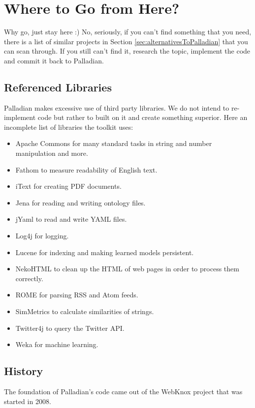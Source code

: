 \documentclass[a4paper,twoside]{book}      %
\begin{document}
\chapter{Where to Go from Here?}
Why go, just stay here :) No, seriously, if you can't find something that you need, there is a list of similar projects in Section \ref{sec:alternativesToPalladian} that you can scan through. If you still can't find it, research the topic, implement the code and commit it back to Palladian.

\section{Referenced Libraries}
Palladian makes excessive use of third party libraries. We do not intend to re-implement code but rather to built on it and create something superior. Here an incomplete list of libraries the toolkit uses:
\begin{itemize}
\item Apache Commons \cite{apachecommons} for many standard tasks in string and number manipulation and more.
\item Fathom \cite{fathom} to measure readability of English text.
\item iText \cite{itext} for creating PDF documents.
\item Jena \cite{jena} for reading and writing ontology files.
\item jYaml \cite{jyaml} to read and write YAML files.
\item Log4j \cite{log4j} for logging.
\item Lucene \cite{lucene} for indexing and making learned models persistent.
\item NekoHTML \cite{nekohtml} to clean up the HTML of web pages in order to process them correctly.
\item ROME \cite{rome} for parsing RSS and Atom feeds.
\item SimMetrics \cite{simmetrics} to calculate similarities of strings.
\item Twitter4j \cite{twitter4j} to query the Twitter API.
\item Weka \cite{hall2009weka} for machine learning.
\end{itemize}

\section{History}
The foundation of Palladian's code came out of the WebKnox project\cite{webknox} that was started in 2008.%
\end{document}
